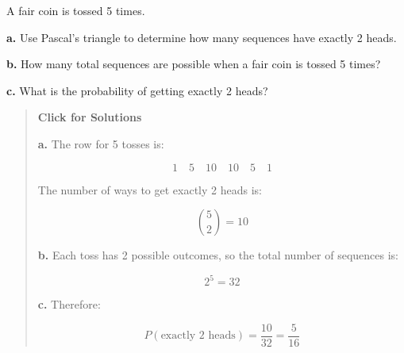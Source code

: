 \documentclass[
  letterpaper,
  DIV=11,
  numbers=noendperiod]{scrreprt}
\begin{document}
\begin{tcolorbox}[enhanced jigsaw, arc=.35mm, bottomrule=.15mm, bottomtitle=1mm, breakable, colback=white, colbacktitle=quarto-callout-note-color!10!white, colframe=quarto-callout-note-color-frame, coltitle=black, left=2mm, leftrule=.75mm, opacityback=0, opacitybacktitle=0.6, rightrule=.15mm, title=\textcolor{quarto-callout-note-color}{\faInfo}\hspace{0.5em}{Question 12}, titlerule=0mm, toprule=.15mm, toptitle=1mm]

A fair coin is tossed 5 times.

\textbf{a.} Use Pascal's triangle to determine how many sequences have
exactly 2 heads.

\textbf{b.} How many total sequences are possible when a fair coin is
tossed 5 times?

\textbf{c.} What is the probability of getting exactly 2 heads?

\begin{quote}
\textbf{Click for Solutions}

\textbf{a.} The row for 5 tosses is:

\[
1 \quad 5 \quad 10 \quad 10 \quad 5 \quad 1
\]

The number of ways to get exactly 2 heads is:

\[
\binom{5}{2}=10
\]

\textbf{b.} Each toss has 2 possible outcomes, so the total number of
sequences is:

\[
2^5 = 32
\]

\textbf{c.} Therefore:

\[
P(\text{exactly 2 heads}) = \frac{10}{32} = \frac{5}{16}
\]
\end{quote}

\end{tcolorbox}
\end{document}
